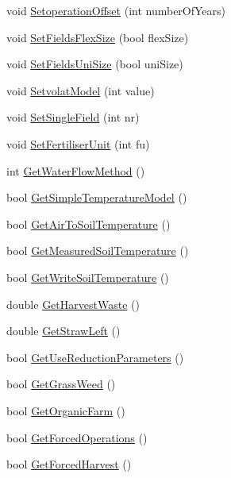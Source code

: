 \begin{DoxyCompactItemize}
\item 
void \hyperlink{classcontrol_parameters_a020ac9a97ec3af51bb2a921810a7cfcd}{SetoperationOffset} (int numberOfYears)
\item 
void \hyperlink{classcontrol_parameters_adf610c19ca264fe9529a0817e2c3142d}{SetFieldsFlexSize} (bool flexSize)
\item 
void \hyperlink{classcontrol_parameters_aed613973e136c1ff17be0e2e251698da}{SetFieldsUniSize} (bool uniSize)
\item 
void \hyperlink{classcontrol_parameters_a41cbb9fab54ae32c76dbf36104dd14e9}{SetvolatModel} (int value)
\item 
void \hyperlink{classcontrol_parameters_aa3ae5ac8d10b8b1e3ef726d77a8bb7d5}{SetSingleField} (int nr)
\item 
void \hyperlink{classcontrol_parameters_a9a3bdac021c3062f68ff30f0c178a660}{SetFertiliserUnit} (int fu)
\item 
int \hyperlink{classcontrol_parameters_aa23014a0d5a57beef02dc17787ca5ff6}{GetWaterFlowMethod} ()
\item 
bool \hyperlink{classcontrol_parameters_acc775aa5ded70768f3248110f1ff47b7}{GetSimpleTemperatureModel} ()
\item 
bool \hyperlink{classcontrol_parameters_add34033c9c86c35d6f55c9da59db3818}{GetAirToSoilTemperature} ()
\item 
bool \hyperlink{classcontrol_parameters_ae6fc8fcf70764dce9c38d52aaaad6bfe}{GetMeasuredSoilTemperature} ()
\item 
bool \hyperlink{classcontrol_parameters_a5222f361b4bdd1ce711b9b930b7bef56}{GetWriteSoilTemperature} ()
\item 
double \hyperlink{classcontrol_parameters_a3a4380546d0ccc1a1e244dd100afb6a6}{GetHarvestWaste} ()
\item 
double \hyperlink{classcontrol_parameters_af431ae885c2ad1e5326c4b2e0a8bd26e}{GetStrawLeft} ()
\item 
bool \hyperlink{classcontrol_parameters_a3c794ab0f97f25c5b543ae366a9f2ebb}{GetUseReductionParameters} ()
\item 
bool \hyperlink{classcontrol_parameters_a75a0db71558f99e709887174e404771d}{GetGrassWeed} ()
\item 
bool \hyperlink{classcontrol_parameters_af374b7e293c842883e0fd051df18dd90}{GetOrganicFarm} ()
\item 
bool \hyperlink{classcontrol_parameters_a148298acd1a20a91ddf723cbbea6f02f}{GetForcedOperations} ()
\item 
bool \hyperlink{classcontrol_parameters_aef19039d66ec9aafcc7c668dd7f50e29}{GetForcedHarvest} ()

\end{DoxyCompactItemize}
